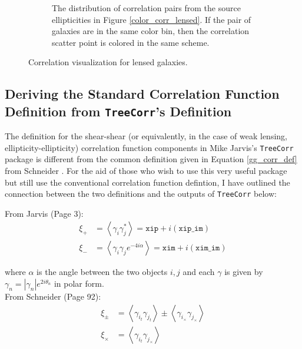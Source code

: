 \documentclass[%
 reprint,
 amsmath,amssymb,
 aps,nofootinbib
]{revtex4-1}
\begin{document}
\begin{figure}
\begin{subfigure}{0.44\textwidth}
        \captionsetup{justification=raggedright,singlelinecheck=false}
        \caption{The distribution of correlation pairs from the source ellipticities in Figure \ref{color_corr_lensed}. If the pair of galaxies are in the same color bin, then the correlation scatter point is colored in the same scheme.}
        \label{corr_dist_lensed}
    \end{subfigure}
    \vspace{-.05in}
    \caption{Correlation visualization for lensed galaxies.}
    \label{colored_corr_lensed}
\end{figure}



\newpage

\subsection{Deriving the Standard Correlation Function Definition from \texttt{TreeCorr}'s Definition} \label{corr_defs}

The definition for the shear-shear (or equivalently, in the case of weak lensing, ellipticity-ellipticity) correlation function components in Mike Jarvis's \texttt{TreeCorr} package is different from the common definition given in Equation \eqref{gg_corr_def} from Schneider \cite{schneider}. For the aid of those who wish to use this very useful package but still use the conventional correlation function defintion, I have outlined the connection between the two definitions and the outputs of \texttt{TreeCorr} below:

\setlength\parindent{0pt}

\vspace{0.25 in}

From Jarvis \cite{jarvis} (Page 3):
\begin{align}
\xi_+&=\left<\gamma_i\gamma_j^*\right>=\texttt{xip}+i(\texttt{xip\_im})\label{s+}\\
\xi_-&=\left<\gamma_i\gamma_je^{-4i\alpha}\right>=\texttt{xim}+i(\texttt{xim\_im})\label{s-}
\end{align}

where $\alpha$ is the angle between the two objects $i,j$ and each $\gamma$ is given by $\gamma_n=|\gamma_n|e^{2i\theta_n}$ in polar form.\\

From Schneider \cite{schneider} (Page 92):
\begin{align}
\xi_\pm&=\left<\gamma_{i_t}\gamma_{j_t}\right>\pm\left<\gamma_{i_\times}\gamma_{j_\times}\right>\label{s+-}\\
\xi_\times&=\left<\gamma_{i_t}\gamma_{j_\times}\right>\label{sx}
\end{align}
\end{document}
